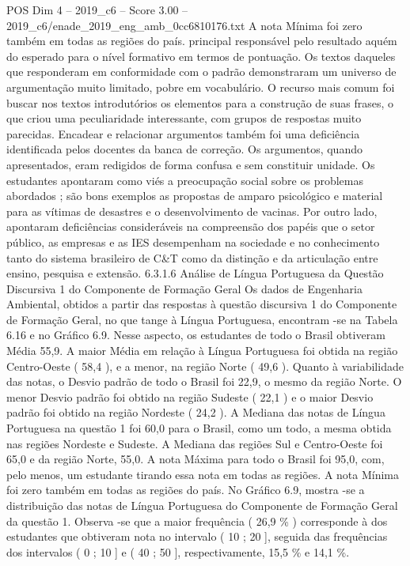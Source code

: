 \begin{textsample}{POS Dim 4 – 2019\_c6 – Score 3.00 – 2019\_c6/enade\_2019\_eng\_amb\_0cc6810176.txt}
A nota Mínima foi zero também em todas as regiões do país. principal responsável pelo resultado aquém do esperado para o nível formativo em termos de pontuação.
Os textos daqueles que responderam em conformidade com o padrão demonstraram um universo de argumentação muito limitado, pobre em vocabulário.
O recurso mais comum foi buscar nos textos introdutórios os elementos para a construção de suas frases, o que criou uma peculiaridade interessante, com grupos de respostas muito parecidas.
Encadear e relacionar argumentos também foi uma deficiência identificada pelos docentes da banca de correção.
Os argumentos, quando apresentados, eram redigidos de forma confusa e sem constituir unidade.
Os estudantes apontaram como viés a preocupação social sobre os problemas abordados ; são bons exemplos as propostas de amparo psicológico e material para as vítimas de desastres e o desenvolvimento de vacinas.
Por outro lado, apontaram deficiências consideráveis na compreensão dos papéis que o setor público, as empresas e as IES desempenham na sociedade e no conhecimento tanto do sistema brasileiro de C\&T como da distinção e da articulação entre ensino, pesquisa e extensão. 6.3.1.6 Análise de Língua Portuguesa da Questão Discursiva 1 do Componente de Formação Geral Os dados de Engenharia Ambiental, obtidos a partir das respostas à questão discursiva 1 do Componente de Formação Geral, no que tange à Língua Portuguesa, encontram -se na Tabela 6.16 e no Gráfico 6.9.
Nesse aspecto, os estudantes de todo o Brasil obtiveram Média 55,9.
A maior Média em relação à Língua Portuguesa foi obtida na região Centro-Oeste ( 58,4 ), e a menor, na região Norte ( 49,6 ).
Quanto à variabilidade das notas, o Desvio padrão de todo o Brasil foi 22,9, o mesmo da região Norte.
O menor Desvio padrão foi obtido na região Sudeste ( 22,1 ) e o maior Desvio padrão foi obtido na região Nordeste ( 24,2 ).
A Mediana das notas de Língua Portuguesa na questão 1 foi 60,0 para o Brasil, como um todo, a mesma obtida nas regiões Nordeste e Sudeste.
A Mediana das regiões Sul e Centro-Oeste foi 65,0 e da região Norte, 55,0.
A nota Máxima para todo o Brasil foi 95,0, com, pelo menos, um estudante tirando essa nota em todas as regiões.
A nota Mínima foi zero também em todas as regiões do país.
No Gráfico 6.9, mostra -se a distribuição das notas de Língua Portuguesa do Componente de Formação Geral da questão 1.
Observa -se que a maior frequência ( 26,9 \% ) corresponde à dos estudantes que obtiveram nota no intervalo ( 10 ; 20 ], seguida das frequências dos intervalos ( 0 ; 10 ] e ( 40 ; 50 ], respectivamente, 15,5 \% e 14,1 \%.

\end{textsample}
